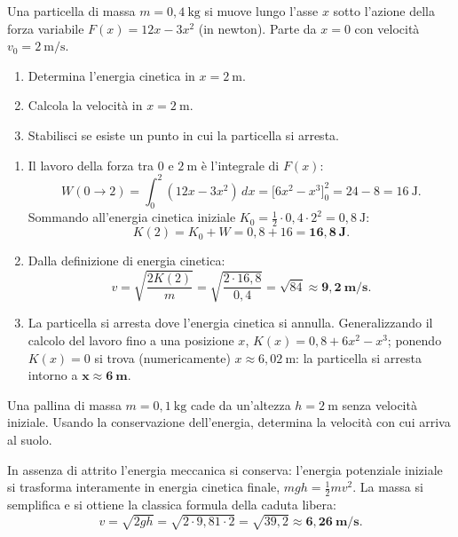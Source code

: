 \begin{question}[ID=2.5, subtitle={Particella con forza variabile F(x) = 12x - 3x² e punto di arresto}, tags={forze vive, energia, integrale}, difficulty=difficile]
Una particella di massa $m = 0{,}4\ \text{kg}$ si muove lungo l'asse $x$ sotto l'azione della forza variabile $F(x) = 12x - 3x^2$ (in newton). Parte da $x = 0$ con velocità $v_0 = 2\ \text{m/s}$.
\begin{enumerate}
    \item Determina l'energia cinetica in $x = 2\ \text{m}$.
    \item Calcola la velocità in $x = 2\ \text{m}$.
    \item Stabilisci se esiste un punto in cui la particella si arresta.
\end{enumerate}
\begin{solution}
\begin{enumerate}
    \item Il lavoro della forza tra $0$ e $2\ \text{m}$ è l'integrale di $F(x)$:
    \[
    W(0\to 2) = \int_0^2 (12x - 3x^2)\,dx = \bigl[6x^2 - x^3\bigr]_0^2 = 24 - 8 = 16\ \text{J}.
    \]
    Sommando all'energia cinetica iniziale $K_0 = \tfrac{1}{2}\cdot 0{,}4\cdot 2^2 = 0{,}8\ \text{J}$:
    \[
    K(2) = K_0 + W = 0{,}8 + 16 = \mathbf{16{,}8\ \text{J}}.
    \]
    \item Dalla definizione di energia cinetica:
    \[
    v = \sqrt{\frac{2K(2)}{m}} = \sqrt{\frac{2\cdot 16{,}8}{0{,}4}} = \sqrt{84} \approx \mathbf{9{,}2\ \text{m/s}}.
    \]
    \item La particella si arresta dove l'energia cinetica si annulla. Generalizzando il calcolo del lavoro fino a una posizione $x$, $K(x) = 0{,}8 + 6x^2 - x^3$; ponendo $K(x) = 0$ si trova (numericamente) $x \approx 6{,}02\ \text{m}$: la particella si arresta intorno a $\mathbf{x \approx 6\ \text{m}}$.
\end{enumerate}
\end{solution}
\end{question}

\begin{question}[ID=3.1, subtitle={Pallina in caduta libera da 2 m}, tags={conservazione energia, caduta libera}, difficulty=facile]
Una pallina di massa $m = 0{,}1\ \text{kg}$ cade da un'altezza $h = 2\ \text{m}$ senza velocità iniziale. Usando la conservazione dell'energia, determina la velocità con cui arriva al suolo.
\begin{solution}
In assenza di attrito l'energia meccanica si conserva: l'energia potenziale iniziale si trasforma interamente in energia cinetica finale, $mgh = \tfrac{1}{2}mv^2$. La massa si semplifica e si ottiene la classica formula della caduta libera:
\[
v = \sqrt{2gh} = \sqrt{2\cdot 9{,}81\cdot 2} = \sqrt{39{,}2} \approx \mathbf{6{,}26\ \text{m/s}}.
\]
\end{solution}
\end{question}


